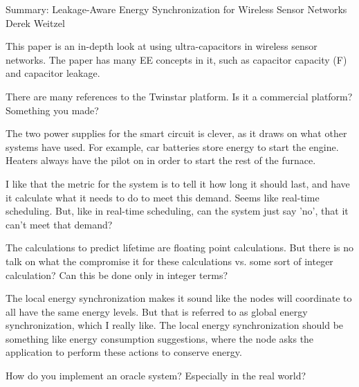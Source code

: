 \documentclass[12pt]{article}
\begin{document}
\begin{center}
{\huge Summary: Leakage-Aware Energy Synchronization for Wireless Sensor Networks } \\
Derek Weitzel
\end{center}

This paper is an in-depth look at using ultra-capacitors in wireless sensor networks.  The paper has many EE concepts in it, such as capacitor capacity (F) and capacitor leakage.

There are many references to the Twinstar platform.  Is it a commercial platform?  Something you made?

The two power supplies for the smart circuit is clever, as it draws on what other systems have used.  For example, car batteries store energy to start the engine.  Heaters always have the pilot on in order to start the rest of the furnace.

I like that the metric for the system is to tell it how long it should last, and have it calculate what it needs to do to meet this demand.  Seems like real-time scheduling.  But, like in real-time scheduling, can the system just say 'no', that it can't meet that demand?

The calculations to predict lifetime are floating point calculations.  But there is no talk on what the compromise it for these calculations vs. some sort of integer calculation?  Can this be done only in integer terms?

The local energy synchronization makes it sound like the nodes will coordinate to all have the same energy levels.  But that is referred to as global energy synchronization, which I really like.  The local energy synchronization should be something like energy consumption suggestions, where the node asks the application to perform these actions to conserve energy.

How do you implement an oracle system?  Especially in the real world?
\end{document}
